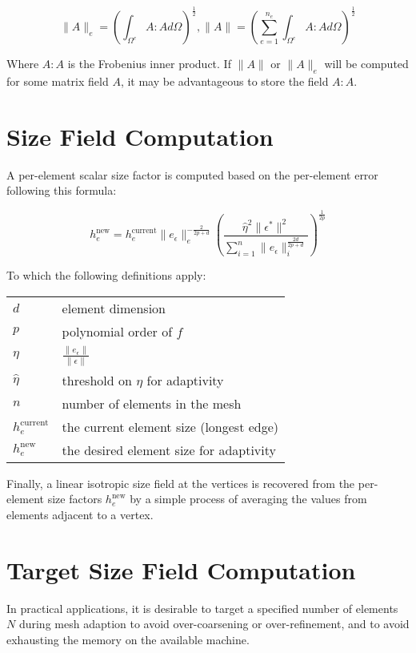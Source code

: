 \documentclass{article}
\begin{document}
\[\|A\|_e=
\left(
\int_{\Omega^e} A : A d\Omega
\right)^\frac12,
\|A\|=
\left(
\sum_{e=1}^{n_e}
\int_{\Omega^e} A : A d\Omega
\right)^\frac12\]

Where $A:A$ is the Frobenius inner product.
If $\|A\|$ or $\|A\|_e$ will be computed for
some matrix field $A$, it may be advantageous
to store the field $A:A$.

\section{Size Field Computation}

A per-element scalar size factor is computed based on
the per-element error following this formula:

\[h^\text{new}_e = h^\text{current}_e
\|e_\epsilon\|^{-\frac{2}{2p+d}}_e
\left(
\frac
{\hat{\eta}^2\|\epsilon^*\|^2}
{\sum_{i=1}^n\|e_\epsilon\|^\frac{2d}{2p+d}_i}
\right)^\frac{1}{2p}
\]

To which the following definitions apply:

\begin{center}
\begin{tabular}{ll}
$d$ & element dimension \\
$p$ & polynomial order of $f$ \\
$\eta$ & $\frac{\|e_\epsilon\|}{\|\epsilon\|}$ \\
$\hat{\eta}$ & threshold on $\eta$ for adaptivity \\
$n$ & number of elements in the mesh \\
$h_e^\text{current}$ & the current element size (longest edge) \\
$h_e^\text{new}$ & the desired element size for adaptivity \\
\end{tabular}
\end{center}

Finally, a linear isotropic size field at
the vertices is recovered from the per-element
size factors $h_e^\text{new}$ by a simple
process of averaging the values from elements
adjacent to a vertex.

\section{Target Size Field Computation}

In practical applications, it is desirable to target a specified
number of elements $N$ during mesh adaption to avoid over-coarsening
or over-refinement, and to avoid exhausting the memory on the available
machine.
\end{document}
